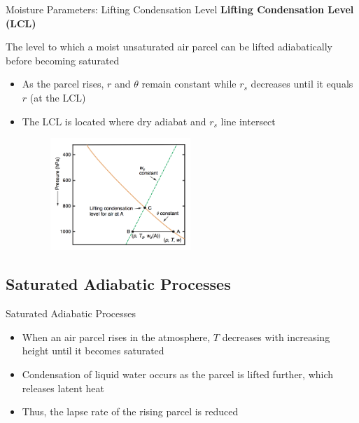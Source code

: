 
\begin{frame}{Moisture Parameters: Lifting Condensation Level}
\textbf{Lifting Condensation Level (LCL)}
\begin{fancydefs}
	The level to which a moist unsaturated air parcel can be lifted adiabatically before becoming saturated
\end{fancydefs}
\begin{itemize}
	\item As the parcel rises, $r$ and $\theta$ remain constant while $r_s$ decreases until it equals $r$ (at the LCL)
	\item The LCL is located where dry adiabat and $r_s$ line intersect
	\begin{figure}
		\includegraphics[width=0.5\textwidth]{fig4}
	\end{figure}
\end{itemize}
\end{frame}

\subsection{Saturated Adiabatic Processes}
\begin{frame}{Saturated Adiabatic Processes}
\begin{itemize}
	\item When an air parcel rises in the atmosphere, $T$ decreases with increasing height until it becomes saturated
	\item Condensation of liquid water occurs as the parcel is lifted further, which releases latent heat
	\item Thus, the lapse rate of the rising parcel is reduced 
	\end{itemize}
\end{frame}


